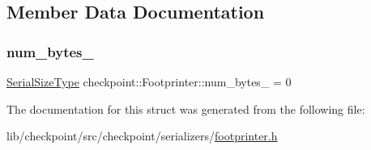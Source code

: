\subsection{Member Data Documentation}
\mbox{\label{structcheckpoint_1_1_footprinter_aa1e1872e87895430c567eb893b6f74bf}} 
\subsubsection{\texorpdfstring{num\+\_\+bytes\+\_\+}{num\_bytes\_}}
{\footnotesize\ttfamily \hyperlink{namespacecheckpoint_a083f6674da3f94c2901b18c6d238217c}{Serial\+Size\+Type} checkpoint\+::\+Footprinter\+::num\+\_\+bytes\+\_\+ = 0\hspace{0.3cm}{\ttfamily [private]}}



The documentation for this struct was generated from the following file\+:\begin{DoxyCompactItemize}
\item 
lib/checkpoint/src/checkpoint/serializers/\hyperlink{footprinter_8h}{footprinter.\+h}\end{DoxyCompactItemize}
